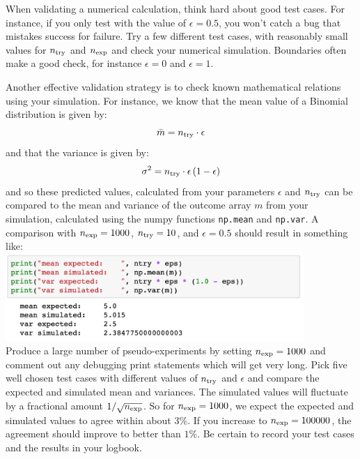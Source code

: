 When validating a numerical calculation, think hard about good test
cases.  For instance, if you only test with the value of $\epsilon =
0.5$, you won't catch a bug that mistakes success for failure.  Try a
few different test cases, with reasonably small values for $n_{\rm
  try}$ and $n_{\rm exp}$ and check your numerical simulation.
Boundaries often make a good check, for instance $\epsilon = 0$ and
$\epsilon = 1$.

Another effective validation strategy is to check known mathematical
relations using your simulation.  For instance, we know that the mean
value of a Binomial distribution is given by:
\begin{equation} \label{eqn:binom_mean}
\bar{m} = n_{\rm try} \cdot \epsilon
\end{equation}
and that the variance is given by:
\begin{equation} \label{eqn:binom_var}
\sigma^2 = n_{\rm try} \cdot \epsilon \, (1 - \epsilon)
\end{equation}
and so these predicted values, calculated from your parameters
$\epsilon$ and $n_{\rm try}$ can be compared to the mean and variance
of the outcome array $m$ from your simulation, calculated using the numpy functions {\tt np.mean} and {\tt np.var}.  A
comparison with $n_{\rm exp}=1000$, $n_{\rm try}=10$, and
$\epsilon=0.5$ should result in something like:\\
\includegraphics[width=0.85\textwidth]{figs/labs/distributions/validate.png}\\ 
Produce a large number of pseudo-experiments by setting $n_{\rm exp} =
1000$ and comment out any debugging print statements which will get
very long.  Pick five well chosen test cases with different values of
$n_{\rm try}$ and $\epsilon$ and compare the expected and simulated
mean and variances.  The simulated values will fluctuate by a
fractional amount $1/\sqrt{n_{\rm exp}}$.  So for $n_{\rm exp} =
1000$, we expect the expected and simulated values to agree within
about $3\%$.  If you increase to $n_{\rm exp} = 100000$, the agreement
should improve to better than $1\%$.  Be certain to record your test
cases and the results in your logbook.

